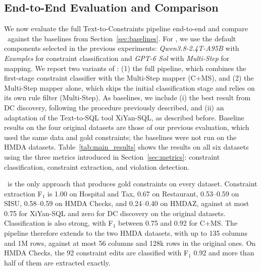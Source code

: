 \subsection{End-to-End Evaluation and Comparison}
\label{sec:endtoend}

We now evaluate the full Text-to-Constraints pipeline end-to-end and compare \system\ against the baselines from Section~\ref{sec:baselines}. For \system, we use the default components selected in the previous experiments: \emph{Qwen3.8-2.4T-A95B} with \emph{Examples} for constraint classification and \emph{GPT-6 Sol} with \emph{Multi-Step} for mapping.
We report two variants of \system: (1) the full pipeline, which combines the first-stage constraint classifier with the Multi-Step mapper (C+MS), and (2) the Multi-Step mapper alone, which skips the initial classification stage and relies on its own rule filter (Multi-Step).
As baselines, we include (i) the best result from DC discovery, following the procedure previously described, and (ii) an adaptation of the Text-to-SQL tool XiYan-SQL, as described before. Baseline results on the four original datasets are those of our previous evaluation, which used the same data and gold constraints; the baselines were not run on the HMDA datasets.
Table~\ref{tab:main_results} shows the results on all six datasets using the three metrics introduced in Section~\ref{sec:metrics}: constraint classification, constraint extraction, and violation detection.

\begin{table}[!ht]
  \centering
  \small
  \setlength{\tabcolsep}{4pt}
  \resizebox{\columnwidth}{!}{%
  
  }%
\caption{End-to-end comparison of \system\ modes, Classifier+Multi-Step (C+MS) and Multi-Step, and the baselines across six
datasets. \textbf{Profiling} denotes DC discovery from data alone, and
\textbf{Text2SQL} denotes XiYan-SQL adapted to generate violation queries from
regulatory sentences; their results on the four original datasets come from our
previous evaluation, and -- marks configurations not run. n/a indicates that the metric is not applicable; bold
marks the best F$_1$ for each metric and dataset.}
  \label{tab:main_results}
\end{table}

\system\ is the only approach that produces gold constraints on every dataset.
Constraint extraction F$_1$ is 1.00 on Hospital and Tax, 0.67 on Restaurant,
0.53--0.59 on SISU, 0.58--0.59 on HMDA Checks, and 0.24--0.40 on HMDAZ, against
at most 0.75 for XiYan-SQL and zero for DC discovery on the original datasets.
Classification is also strong, with F$_1$ between 0.75 and 0.92 for C+MS. The
pipeline therefore extends to the two HMDA datasets, with up to 135 columns and
1M rows, against at most 56 columns and 128k rows in the original ones. On
HMDA Checks, the 92 constraint edits are classified with F$_1$ 0.92 and more than
half of them are extracted exactly.

